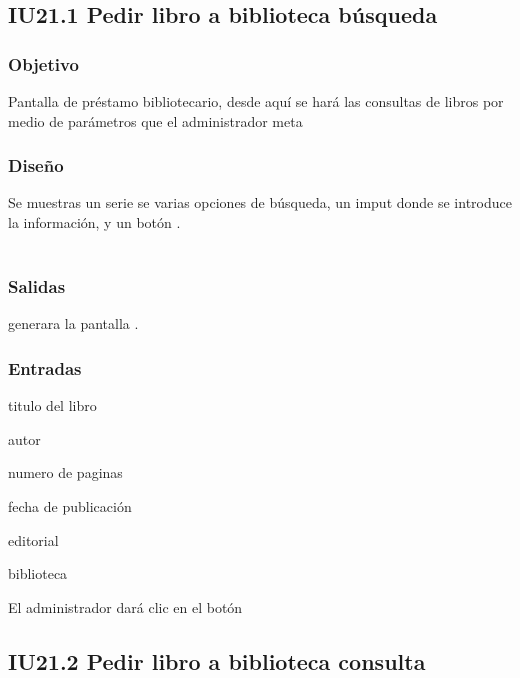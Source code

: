 \newpage
\subsection{IU21.1 Pedir libro a biblioteca búsqueda}

\subsubsection{Objetivo}
	Pantalla de préstamo bibliotecario, desde aquí se hará las consultas de libros por medio de parámetros que el administrador meta

\subsubsection{Diseño}
	Se muestras un serie se varias opciones de búsqueda, un imput donde se introduce la información, y un botón .  \\\\


\subsubsection{Salidas}
	\begin{Citemize}
		\item generara la pantalla . 
	\end{Citemize}
	
\subsubsection{Entradas}
	\begin{Citemize}
		\item titulo del libro 
		\item autor
		\item numero de paginas
		\item fecha de publicación
		\item editorial
		\item biblioteca
		\item El administrador dará clic en el botón \IUbutton{Búsqueda}
	\end{Citemize}


\subsection{IU21.2 Pedir libro a biblioteca consulta}


